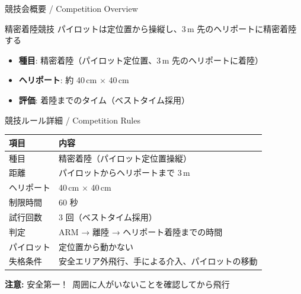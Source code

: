 \documentclass[aspectratio=169, 14pt]{beamer}
\begin{document}
\begin{frame}
  \titlepage
\end{frame}

\begin{frame}{競技会概要 / Competition Overview}
  \begin{block}{精密着陸競技}
    パイロットは定位置から操縦し、3\,m 先のヘリポートに精密着陸する
  \end{block}

  \vspace{1em}

  \begin{itemize}
    \item \textbf{種目}: 精密着陸（パイロット定位置、3\,m 先のヘリポートに着陸）
    \item \textbf{ヘリポート}: 約 40\,cm $\times$ 40\,cm
    \item \textbf{評価}: 着陸までのタイム（ベストタイム採用）
  \end{itemize}
\end{frame}

\begin{frame}{競技ルール詳細 / Competition Rules}
  \centering
  \begin{tabular}{ll}
    \hline
    \textbf{項目} & \textbf{内容} \\
    \hline
    種目      & 精密着陸（パイロット定位置操縦） \\
    距離      & パイロットからヘリポートまで 3\,m \\
    ヘリポート & 40\,cm $\times$ 40\,cm \\
    制限時間  & 60 秒 \\
    試行回数  & 3 回（ベストタイム採用） \\
    判定      & ARM → 離陸 → ヘリポート着陸までの時間 \\
    パイロット & 定位置から動かない \\
    失格条件  & 安全エリア外飛行、手による介入、パイロットの移動 \\
    \hline
  \end{tabular}

  \vspace{0.3em}
  {\small \textbf{注意:} 安全第一！\ 周囲に人がいないことを確認してから飛行}
\end{frame}
\end{document}
